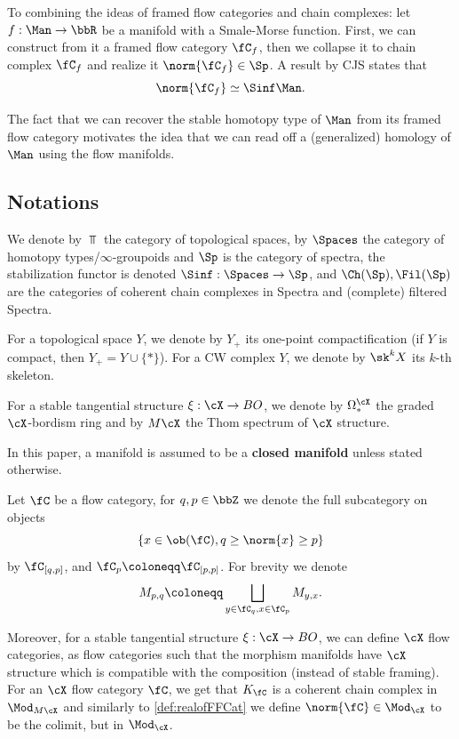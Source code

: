 To combining the ideas of framed flow categories and chain complexes: let $f: \Man \to \bbR$ be a manifold with a Smale-Morse function. First, we can construct from it a framed flow category $\fC_f$, then we collapse it to chain complex $\fC_f$ and realize it $\norm{\fC_f} \in \Sp$. A result by CJS states that
\begin{equation*}
    \norm{\fC_f} \simeq \Sinf \Man.
\end{equation*}

The fact that we can recover the stable homotopy type of $\Man$ from its framed flow category motivates the idea that we can read off a (generalized) homology of $\Man$ using the flow manifolds.

\subsection*{Notations}
We denote by $\Top$ the category of topological spaces, by $\Spaces$ the category of homotopy types/$\infty$-groupoids and $\Sp$ is the category of spectra, the stabilization functor is denoted $\Sinf: \Spaces \to \Sp$, and $\Ch(\Sp), \Fil(\Sp)$ are the categories of coherent chain complexes in Spectra and (complete) filtered Spectra.

For a topological space $Y$, we denote by $Y_+$ its one-point compactification (if $Y$ is compact, then $Y_+ = Y \cup \{*\}$).
For a CW complex $Y$, we denote by $\sk^k X$ its $k$-th skeleton.

For a stable tangential structure $\xi: \cX \to BO$, we denote by $\Omega^{\cX}_*$ the graded $\cX$-bordism ring and by $M\cX$ the Thom spectrum of $\cX$ structure.

In this paper, a manifold is assumed to be a \textbf{closed manifold} unless stated otherwise.

Let $\fC$ be a flow category, for $q,p \in \bbZ$ we denote the full subcategory on objects
\begin{equation*}
    \{x \in \ob(\fC), q \ge \norm{x}\ge p\}
\end{equation*}
by $\fC_{[q,p]}$, and $\fC_p \coloneqq \fC_{[p,p]}$. For brevity we denote
\begin{equation*}
    M_{p,q}\coloneqq \bigsqcup_{y \in \fC_q, x \in \fC_p} M_{y,x}.
\end{equation*}

Moreover, for a stable tangential structure $\xi: \cX \to BO$, we can define $\cX$ flow categories, as flow categories such that the morphism manifolds have $\cX$ structure which is compatible with the composition (instead of stable framing). For an $\cX$ flow category $\fC$, we get that $K_{\fC}$ is a coherent chain complex in $\Mod_{M\cX}$ and similarly to \cref{def:realofFFCat} we define $\norm{\fC} \in \Mod_{\cX}$ to be the colimit, but in $\Mod_{\cX}$.

